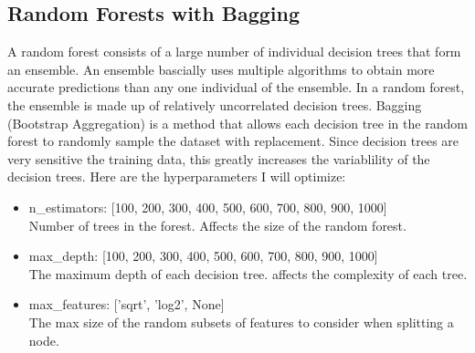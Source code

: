 \documentclass[12pt]{article}
\begin{document}
\subsection{Random Forests with Bagging}
A random forest consists of a large number of individual decision trees that form an ensemble. An ensemble bascially uses multiple algorithms to obtain more accurate predictions than any one individual of the ensemble. In a random forest, the ensemble is made up of relatively uncorrelated decision trees. Bagging (Bootstrap Aggregation) is a method that allows each decision tree in the random forest to randomly sample the dataset with replacement. Since decision trees are very sensitive the training data, this greatly increases the variablility of the decision trees. Here are the hyperparameters I will optimize:
\begin{itemize}
    \item n\_estimators: [100, 200, 300, 400, 500, 600, 700, 800, 900, 1000]
    \\ Number of trees in the forest. Affects the size of the random forest.
    \item max\_depth: [100, 200, 300, 400, 500, 600, 700, 800, 900, 1000]
    \\ The maximum depth of each decision tree. affects the complexity of each tree.
    \item max\_features: ['sqrt', 'log2', None]
    \\ The max size of the random subsets of features to consider when splitting a node.
\end{itemize}
\end{document}
